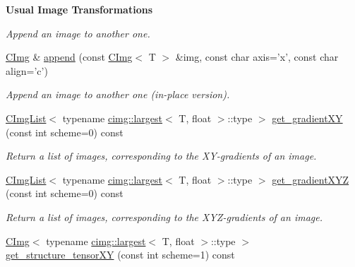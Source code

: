 \begin{Indent}{\bf Usual Image Transformations}
\begin{DoxyCompactItemize}
\begin{DoxyCompactList}\small\item\em Append an image to another one. \item\end{DoxyCompactList}\item 
\hypertarget{structcimg__library_1_1_c_img_a8442c06fc68070a08e4a83c55813dc57}{
\hyperlink{structcimg__library_1_1_c_img}{CImg} \& \hyperlink{structcimg__library_1_1_c_img_a8442c06fc68070a08e4a83c55813dc57}{append} (const \hyperlink{structcimg__library_1_1_c_img}{CImg}$<$ T $>$ \&img, const char axis='x', const char align='c')}
\label{structcimg__library_1_1_c_img_a8442c06fc68070a08e4a83c55813dc57}

\begin{DoxyCompactList}\small\item\em Append an image to another one (in-\/place version). \item\end{DoxyCompactList}\item 
\hyperlink{structcimg__library_1_1_c_img_list}{CImgList}$<$ typename \hyperlink{structcimg__library_1_1cimg_1_1largest}{cimg::largest}$<$ T, float $>$::type $>$ \hyperlink{structcimg__library_1_1_c_img_a83b4b5cfe51e492bf94a8c559c7da304}{get\_\-gradientXY} (const int scheme=0) const 
\begin{DoxyCompactList}\small\item\em Return a list of images, corresponding to the XY-\/gradients of an image. \item\end{DoxyCompactList}\item 
\hyperlink{structcimg__library_1_1_c_img_list}{CImgList}$<$ typename \hyperlink{structcimg__library_1_1cimg_1_1largest}{cimg::largest}$<$ T, float $>$::type $>$ \hyperlink{structcimg__library_1_1_c_img_a1e6795a49e69fcae84efce88eea99090}{get\_\-gradientXYZ} (const int scheme=0) const 
\begin{DoxyCompactList}\small\item\em Return a list of images, corresponding to the XYZ-\/gradients of an image. \item\end{DoxyCompactList}\item 
\hypertarget{structcimg__library_1_1_c_img_a81848f6f08670d76da7804cdfdaeac98}{
\hyperlink{structcimg__library_1_1_c_img}{CImg}$<$ typename \hyperlink{structcimg__library_1_1cimg_1_1largest}{cimg::largest}$<$ T, float $>$::type $>$ \hyperlink{structcimg__library_1_1_c_img_a81848f6f08670d76da7804cdfdaeac98}{get\_\-structure\_\-tensorXY} (const int scheme=1) const }
\label{structcimg__library_1_1_c_img_a81848f6f08670d76da7804cdfdaeac98}


\end{DoxyCompactItemize}
\end{Indent}
